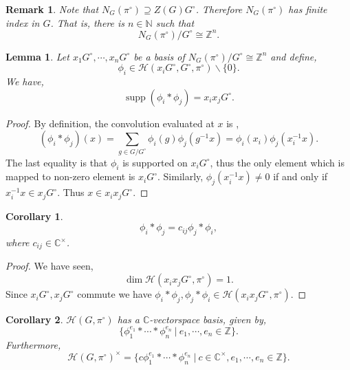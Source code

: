 \documentclass[8pt]{article}
\newtheorem{lemma}{Lemma}[section]
\newtheorem{remark}{Remark}[section]
\newtheorem{corollary}{Corollary} [section]
\DeclareMathOperator{\supp}{supp}
\newcommand{\N}[0]{\mathbb{N}}
\newcommand{\Z}[0]{\mathbb{Z}}
\newcommand{\C}[0]{\mathbb{C}}
\newcommand{\sep}[0]{\:|\:}
\newcommand{\hecke}[0]{\mathscr{H}}
\begin{document}
\begin{remark}
  Note that $N_G(\pi^\circ)\supseteq Z(G)G^\circ$. Therefore $N_G(\pi^\circ)$ has finite index in $G$. That is, there is $n\in\N$ such that 
  \begin{equation*}
    N_G(\pi^\circ)/G^\circ\cong \Z^n.
  \end{equation*}
\end{remark}

\begin{lemma}
  \label{lemma_71}
  Let $x_1G^\circ,\cdots,x_nG^\circ$ be a basis of $N_G(\pi^\circ)/G^\circ\cong \Z^n$ and define,
  \begin{equation*}
    \phi_i\in\hecke(x_iG^\circ,G^\circ,\pi^\circ)\backslash\{0\}.
  \end{equation*}
  We have,
  \begin{equation*}
    \supp(\phi_i\ast\phi_j) = x_ix_jG^\circ.
  \end{equation*}
\end{lemma}

\begin{proof}
  By definition, the convolution evaluated at $x$ is ,
  \begin{equation*}
    (\phi_i\ast\phi_j)(x) = \sum_{g\in G/G^\circ}\phi_i(g)\phi_j(g^{-1}x) = \phi_i(x_i)\phi_j(x_i^{-1}x).
  \end{equation*}
  The last equality is that $\phi_i$ is supported on $x_iG^\circ$, thus the only element which is mapped to non-zero element is $x_iG^\circ$. Similarly, $\phi_j(x_i^{-1}x)\not=0$ if and only if $x_i^{-1}x\in x_jG^\circ$. Thus $x \in x_ix_jG^\circ$. 
\end{proof}
\begin{corollary}
  \label{corollary_72}
  \begin{equation*}
    \phi_i\ast\phi_j = c_{ij}\phi_j\ast\phi_i,
  \end{equation*}
  where $c_{ij}\in\C^\times$. 
\end{corollary}
\begin{proof}
  We have seen,
  \begin{equation*}
    \dim\hecke(x_ix_jG^\circ,\pi^\circ) = 1.
  \end{equation*}
  Since $x_iG^\circ,x_jG^\circ$ commute we have $\phi_i\ast\phi_j,\phi_j\ast\phi_i\in\hecke(x_ix_jG^\circ,\pi^\circ)$.
\end{proof}
\begin{corollary}
  \label{corollary_73}
  $\hecke(G,\pi^\circ)$ has a $\C$-vectorspace basis, given by,
  \begin{equation*}
    \{\phi_1^{e_1}\ast\cdots\ast\phi_n^{e_n}\sep e_1,\cdots,e_n\in\Z\}.
  \end{equation*}
  Furthermore, 
  \begin{equation*}
  \hecke(G,\pi^\circ)^\times  = \{c\phi_1^{e_1}\ast\cdots\ast\phi_n^{e_n}\sep c\in\C^\times,e_1,\cdots,e_n\in\Z\}. 
  \end{equation*}
\end{corollary}
\end{document}
